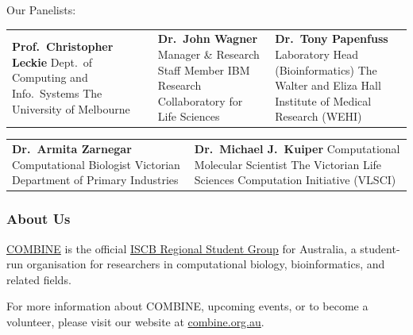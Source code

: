 \documentclass[12pt,]{article}
\begin{document}
\begin{minipage}[c]{\linewidth}
    \centering
    Our Panelists:\\[3ex]
    \begin{tabu}{X[c]X[c]X[c]}
        \textbf{Prof.~Christopher Leckie}\linebreak
            Dept.~of Computing and Info.~Systems\linebreak
            The University of Melbourne
        & \textbf{Dr.~John Wagner}\linebreak
            Manager \& Research Staff Member\linebreak
            IBM Research Collaboratory for Life Sciences
        & \textbf{Dr.~Tony Papenfuss}\linebreak
            Laboratory Head (Bioinformatics)\linebreak
            The Walter and Eliza Hall Institute of Medical Research (WEHI)
    \end{tabu}
    \vspace{3ex}
    \begin{tabu}{X[c]X[c]}
        \textbf{Dr.~Armita Zarnegar}\linebreak
            Computational Biologist\linebreak
            Victorian Department of Primary Industries
        & \textbf{Dr.~Michael J.~Kuiper}\linebreak
            Computational Molecular Scientist\linebreak
            The Victorian Life Sciences Computation Initiative (VLSCI)
    \end{tabu}
\end{minipage}


\subsubsection{About Us}

\href{http://www.combine.org.au}{COMBINE} is the official
\href{http://www.iscbsc.org/content/regional-student-groups}{ISCB
Regional Student Group} for Australia, a student-run organisation for
researchers in computational biology, bioinformatics, and related
fields.

For more information about COMBINE, upcoming events, or to become a
volunteer, please visit our website at
\href{http://www.combine.org.au}{combine.org.au}.
\end{document}
